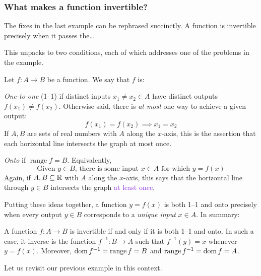 \subsubsection*{What makes a function invertible?}

The fixes in the last example can be rephrased succinctly. A function is invertible precisely when it passes the\ldots  
\begin{quote}
\end{quote}
This unpacks to two conditions, each of which addresses one of the problems in the example.


\begin{defn}{}{}
	Let $f:A\to B$ be a function. We say that $f$ is:
	\begin{enumeratea}
		\item \emph{One-to-one} (1--1) if distinct inputs $x_1\neq x_2\in A$ have distinct outputs $f(x_1)\neq f(x_2)$. Otherwise said, there is \emph{at most} one way to achieve a given output: 
	  \[
	  	f(x_1)=f(x_2)\implies x_1=x_2
	  \]
	  If $A,B$ are sets of real numbers with $A$ along the $x$-axis, this is the assertion that each horizontal line intersects the graph \textcolor{dMagenta}{at most once}.
	  \item \emph{Onto} if $\operatorname{range}f=B$. Equivalently,
	  \[
	  	\text{Given $y\in B$, there is some input $x\in A$ for which $y=f(x)$}
	  \]
	  Again, if $A,B\subseteq\mathbb{R}$ with $A$ along the $x$-axis, this says that the horizontal line through $y\in B$ intersects the graph \textcolor{BlueViolet}{at least once}.
	\end{enumeratea}
\end{defn}

Putting these ideas together, a function $y=f(x)$ is both 1--1 and onto precisely when every output $y\in B$ corresponds to a \emph{unique input} $x\in A$. In summary:

\begin{thm}{}{}
	A function $f:A\to B$ is invertible if and only if it is both 1--1 and onto.\smallbreak
	In such a case, it inverse is the function $f^{-1}:B\to A$ such that $f^{-1}(y)=x$ whenever $y=f(x)$.\smallbreak
	Moreover, $\operatorname{dom} f^{-1}=\operatorname{range}f=B$ and $\operatorname{range} f^{-1}=\operatorname{dom} f=A$.
\end{thm}

Let us revisit our previous example in this context.

